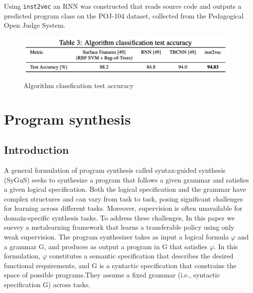 \documentclass{article}
\begin{document}
Using \texttt{inst2vec} an RNN was constructed that reads source code and outputs a predicted program class on the POJ-104 dataset, collected from the Pedagogical Open Judge System.
\begin{figure}[ht]
    \centerline{\includegraphics[width=\columnwidth]{Images/Similarity4-6.png}}
    \caption{Algorithm classfication test accuracy}
\end{figure}


\section{Program synthesis}
\subsection{Introduction}
A general formulation of program synthesis called syntax-guided synthesis (SyGuS) seeks to synthesize a program that follows a given grammar and satisfies a given logical specification. Both the logical specification and the grammar have complex structures and can vary from task to task, posing significant challenges for learning across different tasks. Moreover, supervision is often unavailable for domain-specific synthesis tasks. To address these challenges, In this paper we suevey a metalearning framework that learns a transferable policy using only weak supervision. The program synthesizer takes as input a logical formula $\varphi$ and a grammar G, and produces as output a program in G that satisfies $\varphi$. In this formulation, $\varphi$ constitutes a semantic specification that describes the desired functional requirements, and G is a syntactic specification that constrains the space of possible programs.They assume a fixed grammar (i.e., syntactic specification G) across tasks.
\end{document}
